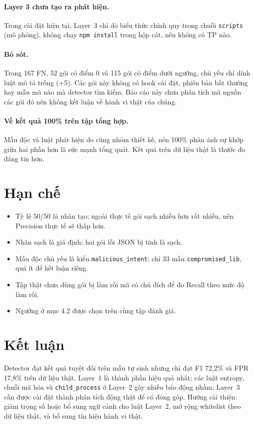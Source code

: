 \documentclass[12pt,a4paper]{article}
\begin{document}
\paragraph{Layer 3 chưa tạo ra phát hiện.} Trong cài đặt hiện tại, Layer~3 chỉ dò biểu thức chính quy trong chuỗi \texttt{scripts} (mô phỏng), không chạy \texttt{npm install} trong hộp cát, nên không có TP nào.

\paragraph{Bỏ sót.} Trong 167 FN, 52 gói có điểm 0 và 115 gói có điểm dưới ngưỡng, chủ yếu chỉ dính luật mô tả trống (+5). Các gói này không có hook cài đặt, phiên bản bất thường hay mẫu mã nào mà detector tìm kiếm. Báo cáo này chưa phân tích mã nguồn các gói đó nên không kết luận về hành vi thật của chúng.

\paragraph{Về kết quả 100\% trên tập tổng hợp.} Mẫu độc và luật phát hiện do cùng nhóm thiết kế, nên 100\% phản ánh sự khớp giữa hai phần hơn là sức mạnh tổng quát. Kết quả trên dữ liệu thật là thước đo đáng tin hơn.

\section{Hạn chế}
\begin{itemize}
  \item Tỷ lệ 50/50 là nhân tạo; ngoài thực tế gói sạch nhiều hơn rất nhiều, nên Precision thực tế sẽ thấp hơn.
  \item Nhãn sạch là giả định; hai gói lỗi JSON bị tính là sạch.
  \item Mẫu độc chủ yếu là kiểu \texttt{malicious\_intent}; chỉ 33 mẫu \texttt{compromised\_lib}, quá ít để kết luận riêng.
  \item Tập thật chưa dùng gói bị làm rối mã có chủ đích để đo Recall theo mức độ làm rối.
  \item Ngưỡng ở mục 4.2 được chọn trên cùng tập đánh giá.
\end{itemize}

\section{Kết luận}
Detector đạt kết quả tuyệt đối trên mẫu tự sinh nhưng chỉ đạt F1 72{,}2\% và FPR 17{,}8\% trên dữ liệu thật. Layer~1 là thành phần hiệu quả nhất; các luật entropy, chuỗi mã hóa và \texttt{child\_process} ở Layer~2 gây nhiều báo động nhầm; Layer~3 cần được cài đặt thành phân tích động thật để có đóng góp. Hướng cải thiện: giảm trọng số hoặc bổ sung ngữ cảnh cho luật Layer~2, mở rộng whitelist theo dữ liệu thật, và bổ sung tín hiệu hành vi thật.
\end{document}
